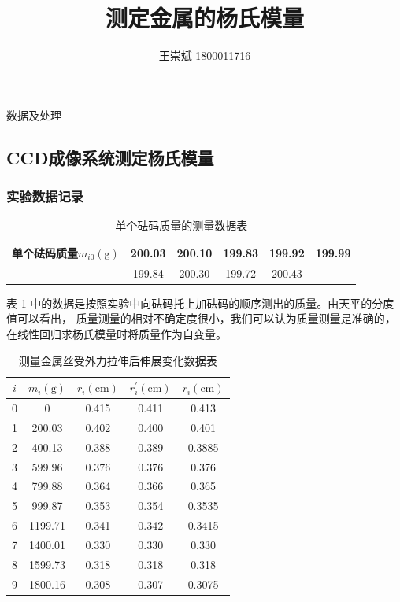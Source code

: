 \documentclass[a4paper]{ctexart}
\title{\textbf{测定金属的杨氏模量}}
\author{王崇斌 1800011716}
\date{}
\makeatletter
\def\cm{\mathrm{cm}}
\def\g{\mathrm{g}}
\renewcommand{\section}{\@startsection{section}{1}{0mm}
	{-\baselineskip}{0.5\baselineskip}{\bf\leftline}}
\makeatother
\begin{document}
	\pagestyle{fancy}
	\chead{}
	\rhead{}
	\maketitle
	\thispagestyle{fancy}
	\section{\large{数据及处理}}
	\subsection{CCD成像系统测定杨氏模量}
	\subsubsection{实验数据记录}
	\begin{table}[htbp]
		\centering
		\caption{单个砝码质量的测量数据表}
		\begin{tabular}{cccccc}
			\toprule[1.5pt]
			单个砝码质量$m_{i0}(\g)$ & 200.03 & 200.10 & 199.83 & 199.92 & 199.99 \\
			\midrule
			 & 199.84 & 200.30 & 199.72 & 200.43 & \\
			 \bottomrule[1.5pt]
		\end{tabular}
		\label{m_data_1}
	\end{table}
	\par 
	表 1 中的数据是按照实验中向砝码托上加砝码的顺序测出的质量。由天平的分度值可以看出，
	质量测量的相对不确定度很小，我们可以认为质量测量是准确的，在线性回归求杨氏模量时将质量作为自变量。\\
	\begin{table}[htbp]
		\centering
		\caption{测量金属丝受外力拉伸后伸展变化数据表}
		\begin{tabular}{ccccc}
			\toprule[1.5pt]
			$i$ & $m_{i}(\g)$ & $r_{i}(\cm)$ & $r_{i}^{'}(\cm)$ & $\bar{r}_{i}(\cm)$\\
			\midrule
			0 & 0       & 0.415 & 0.411 & 0.413 \\
			1 & 200.03  & 0.402 & 0.400 & 0.401 \\
			2 & 400.13  & 0.388 & 0.389 & 0.3885 \\
			3 & 599.96  & 0.376 & 0.376 & 0.376 \\
			4 & 799.88  & 0.364 & 0.366 & 0.365 \\
			5 & 999.87  & 0.353 & 0.354 & 0.3535 \\
			6 & 1199.71 & 0.341 & 0.342 & 0.3415 \\
			7 & 1400.01 & 0.330 & 0.330 & 0.330 \\
			8 & 1599.73 & 0.318 & 0.318 & 0.318 \\
			9 & 1800.16 & 0.308 & 0.307 & 0.3075\\
			\bottomrule[1.5pt]
		\end{tabular}
	\end{table}
\end{document}
